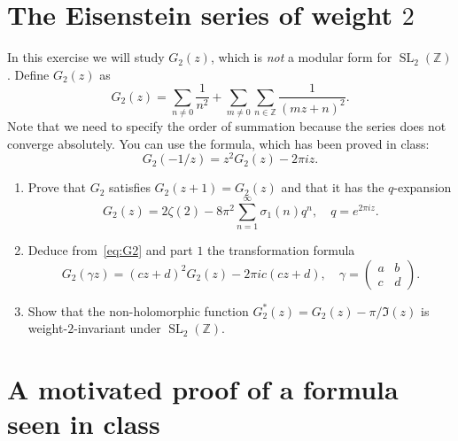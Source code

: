 \documentclass[paper=a4, fontsize=11pt]{scrartcl} %
\numberwithin{equation}{section} %
\numberwithin{figure}{section} %
\numberwithin{table}{section} %
\newcommand{\bbZ}{\mathbb{Z}}
\newcommand{\ZZ}{\bbZ}
\DeclareMathOperator{\SL}{SL}
\newcommand{\mtx}[4]{\left(\begin{matrix}#1&#2\\#3&#4\end{matrix}\right)}
\begin{document}
\section{The Eisenstein series of weight $2$}
In this exercise we will study $G_2(z)$, which is \emph{not} a modular form for $\SL_2(\ZZ)$. Define $G_2(z)$ as
\[
G_2(z)= \sum_{n\neq 0} \frac 1{n^2} +\sum_{m\neq 0}\sum_{n\in\ZZ} \frac{1}{(mz+n)^2}.
\]
Note that we need to specify the order of summation because the series does not converge absolutely. You can use the formula, which has been proved in class:
\begin{equation}
\label{eq:G2}
G_2(-1/z) = z^2G_2(z)- 2\pi i z.
\end{equation}

\begin{enumerate}
\item Prove that $G_2$ satisfies $G_2(z+1)=G_2(z)$ and that it  has the $q$-expansion
\[
G_2(z) = 2\zeta(2) - 8\pi^2\sum_{n=1}^\infty \sigma_1(n)q^n,\quad q=e^{2\pi i z}.
\]
\item Deduce from~\ref{eq:G2} and part $1$ the transformation formula
\[
G_2(\gamma z) = (cz+d)^2G_2(z)- 2\pi i c(cz+d),\quad \gamma=\mtx abcd.
\]
\item Show that the non-holomorphic function  $G_2^*(z) = G_2(z)-\pi/\Im(z)$ is weight-$2$-invariant under $\SL_2(\ZZ)$.
\end{enumerate}

\section{A motivated proof of a formula seen in class}
\end{document}

